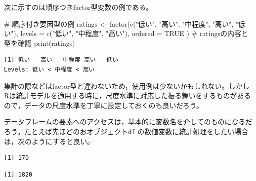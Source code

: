 \documentclass[
  a4paper,
]{ltjsbook}
\newenvironment{Shaded}{\begin{snugshade}}{\end{snugshade}}
\newcommand{\AttributeTok}[1]{\textcolor[rgb]{0.40,0.45,0.13}{#1}}
\newcommand{\CommentTok}[1]{\textcolor[rgb]{0.37,0.37,0.37}{#1}}
\newcommand{\ConstantTok}[1]{\textcolor[rgb]{0.56,0.35,0.01}{#1}}
\newcommand{\FunctionTok}[1]{\textcolor[rgb]{0.28,0.35,0.67}{#1}}
\newcommand{\NormalTok}[1]{\textcolor[rgb]{0.00,0.23,0.31}{#1}}
\newcommand{\OtherTok}[1]{\textcolor[rgb]{0.00,0.23,0.31}{#1}}
\newcommand{\SpecialCharTok}[1]{\textcolor[rgb]{0.37,0.37,0.37}{#1}}
\newcommand{\StringTok}[1]{\textcolor[rgb]{0.13,0.47,0.30}{#1}}
\begin{document}
次に示すのは順序つきfactor型変数の例である。

\begin{Shaded}
\begin{Highlighting}[]
\CommentTok{\# 順序付き要因型の例}
\NormalTok{ratings }\OtherTok{\textless{}{-}} \FunctionTok{factor}\NormalTok{(}\FunctionTok{c}\NormalTok{(}\StringTok{"低い"}\NormalTok{, }\StringTok{"高い"}\NormalTok{, }\StringTok{"中程度"}\NormalTok{, }\StringTok{"高い"}\NormalTok{, }\StringTok{"低い"}\NormalTok{),}
  \AttributeTok{levels =} \FunctionTok{c}\NormalTok{(}\StringTok{"低い"}\NormalTok{, }\StringTok{"中程度"}\NormalTok{, }\StringTok{"高い"}\NormalTok{),}
  \AttributeTok{ordered =} \ConstantTok{TRUE}
\NormalTok{)}
\CommentTok{\# ratingsの内容と型を確認}
\FunctionTok{print}\NormalTok{(ratings)}
\end{Highlighting}
\end{Shaded}

\begin{verbatim}
[1] 低い   高い   中程度 高い   低い  
Levels: 低い < 中程度 < 高い
\end{verbatim}

集計の際などはfactor型と違わないため，使用例は少ないかもしれない。しかしRは統計モデルを適用する時に，尺度水準に対応した振る舞いをするものがあるので，データの尺度水準を丁寧に設定しておくのも良いだろう。

データフレームの要素へのアクセスは，基本的に変数名を介してのものになるだろう。たとえば先ほどのおオブジェクト\texttt{df}
の数値変数に統計処理をしたい場合は，次のようにすると良い。

\begin{Shaded}
\end{Shaded}

\begin{verbatim}
[1] 170
\end{verbatim}

\begin{Shaded}
\end{Shaded}

\begin{verbatim}
[1] 1820
\end{verbatim}
\end{document}
